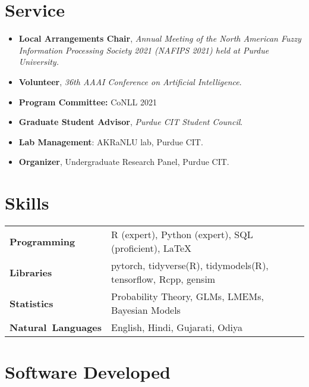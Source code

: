 \documentclass[11pt]{article}
\begin{document}
\section*{Service}
\begin{itemize}
    \item \textbf{Local Arrangements Chair}, \textit{Annual Meeting of the North American Fuzzy Information Processing Society 2021 (NAFIPS 2021) held at Purdue University.}
    \item \textbf{Volunteer}, \textit{36th AAAI Conference on Artificial Intelligence}.
    \item \textbf{Program Committee:} CoNLL 2021
    \item \textbf{Graduate Student Advisor}, \textit{Purdue CIT Student Council}.
    \item \textbf{Lab Management}: AKRaNLU lab, Purdue CIT.
    \item \textbf{Organizer}, Undergraduate Research Panel, Purdue CIT.
\end{itemize}

\renewcommand*{\arraystretch}{1}
\section*{Skills}
\vspace{-1em}
\begin{longtable}{p{}  p{} }
    \textbf{Programming} & R (expert), Python (expert), SQL (proficient), \LaTeX\\
    \textbf{Libraries} & pytorch, tidyverse(R), tidymodels(R), tensorflow, Rcpp, gensim\\
    \textbf{Statistics} & Probability Theory, GLMs, LMEMs, Bayesian Models\\
    \textbf{Natural~Languages} & English, Hindi, Gujarati, Odiya
    \end{longtable}
\section*{Software Developed}
\end{document}
